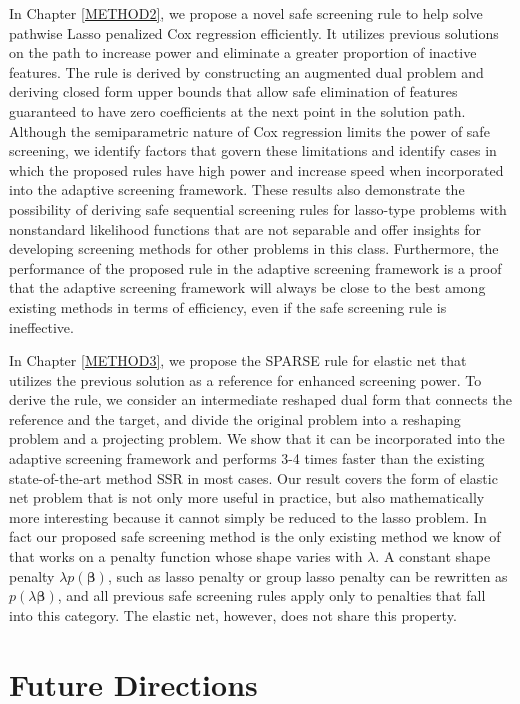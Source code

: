 In Chapter \ref{METHOD2}, we propose a novel safe screening rule to help solve pathwise Lasso penalized Cox regression efficiently. It utilizes previous solutions on the path to increase power and eliminate a greater proportion of inactive features. The rule is derived by constructing an augmented dual problem and deriving closed form upper bounds that allow safe elimination of features guaranteed to have zero coefficients at the next point in the solution path. Although the semiparametric nature of Cox regression limits the power of safe screening, we identify factors that govern these limitations and identify cases in which the proposed rules have high power and increase speed when incorporated into the adaptive screening framework. These results also demonstrate the possibility of deriving safe sequential screening rules for lasso-type problems with nonstandard likelihood functions that are not separable and offer insights for developing screening methods for other problems in this class. Furthermore, the performance of the proposed rule in the adaptive screening framework is a proof that the adaptive screening framework will always be close to the best among existing methods in terms of efficiency, even if the safe screening rule is ineffective.

In Chapter \ref{METHOD3}, we propose the SPARSE rule for elastic net that utilizes the previous solution as a reference for enhanced screening power. To derive the rule, we consider an intermediate reshaped dual form that connects the reference and the target, and divide the original problem into a reshaping problem and a projecting problem. We show that it can be incorporated into the adaptive screening framework and performs 3-4 times faster than the existing state-of-the-art method SSR in most cases. Our result covers the form of elastic net problem that is not only more useful in practice, but also mathematically more interesting because it cannot simply be reduced to the lasso problem. In fact our proposed safe screening method is the only existing method we know of that works on a penalty function whose shape varies with $\lambda$. A constant shape penalty $\lambda p(\boldsymbol\beta)$, such as lasso penalty or group lasso penalty can be rewritten as $p(\lambda\boldsymbol\beta)$, and all previous safe screening rules apply only to penalties that fall into this category. The elastic net, however, does not share this property.

\section{Future Directions}


